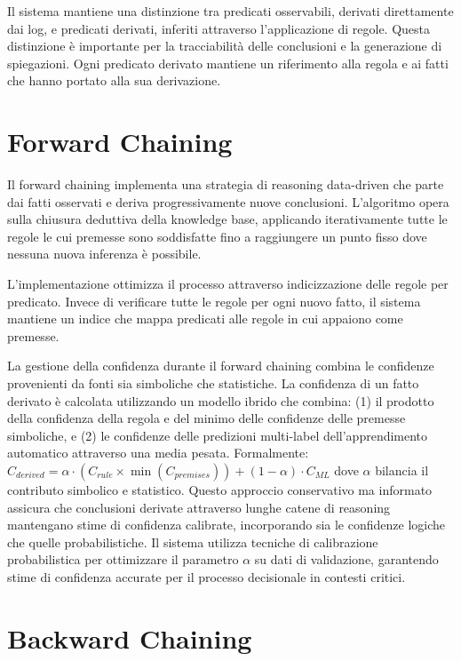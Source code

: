 \documentclass[12pt,a4paper]{report}
\theoremstyle{definition}
\begin{document}
Il sistema mantiene una distinzione tra predicati osservabili, derivati direttamente dai log, e predicati derivati, inferiti attraverso l'applicazione di regole. Questa distinzione è importante per la tracciabilità delle conclusioni e la generazione di spiegazioni. Ogni predicato derivato mantiene un riferimento alla regola e ai fatti che hanno portato alla sua derivazione.

\section{Forward Chaining}

Il forward chaining implementa una strategia di reasoning data-driven che parte dai fatti osservati e deriva progressivamente nuove conclusioni. L'algoritmo opera sulla chiusura deduttiva della knowledge base, applicando iterativamente tutte le regole le cui premesse sono soddisfatte fino a raggiungere un punto fisso dove nessuna nuova inferenza è possibile.

L'implementazione ottimizza il processo attraverso indicizzazione delle regole per predicato. Invece di verificare tutte le regole per ogni nuovo fatto, il sistema mantiene un indice che mappa predicati alle regole in cui appaiono come premesse.

La gestione della confidenza durante il forward chaining combina le confidenze provenienti da fonti sia simboliche che statistiche. La confidenza di un fatto derivato è calcolata utilizzando un modello ibrido che combina: (1) il prodotto della confidenza della regola e del minimo delle confidenze delle premesse simboliche, e (2) le confidenze delle predizioni multi-label dell'apprendimento automatico attraverso una media pesata. Formalmente: $C_{derived} = \alpha \cdot (C_{rule} \times \min(C_{premises})) + (1-\alpha) \cdot C_{ML}$ dove $\alpha$ bilancia il contributo simbolico e statistico. Questo approccio conservativo ma informato assicura che conclusioni derivate attraverso lunghe catene di reasoning mantengano stime di confidenza calibrate, incorporando sia le confidenze logiche che quelle probabilistiche. Il sistema utilizza tecniche di calibrazione probabilistica per ottimizzare il parametro $\alpha$ su dati di validazione, garantendo stime di confidenza accurate per il processo decisionale in contesti critici.

\section{Backward Chaining}
\end{document}
